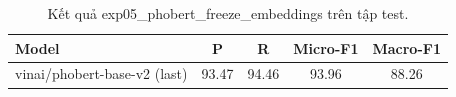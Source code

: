 \begin{table}[t]
\centering
\begin{tabular}{lcccc}
\hline
\textbf{Model} & \textbf{P} & \textbf{R} & \textbf{Micro-F1} & \textbf{Macro-F1} \\
\hline
vinai/phobert-base-v2 (last) & 93.47 & 94.46 & 93.96 & 88.26 \\
\hline
\end{tabular}
\caption{Kết quả exp05_phobert_freeze_embeddings trên tập test.}
\label{tab:main}
\end{table}
